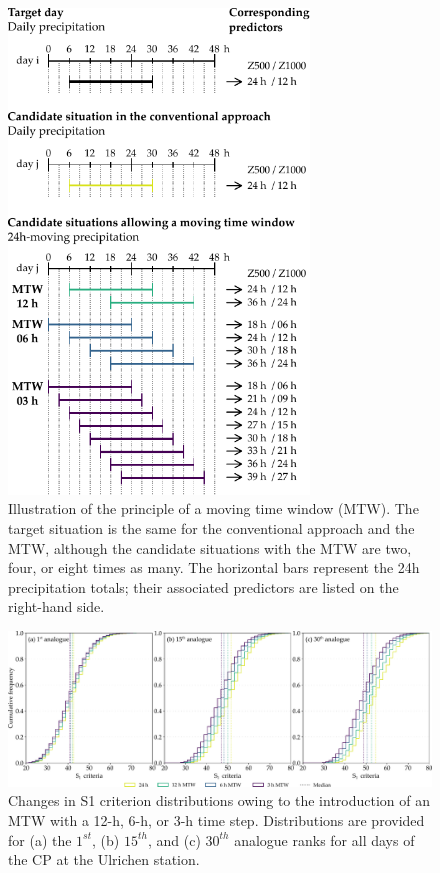 \documentclass[hess, manuscript]{copernicus}
\begin{document}
	\begin{figure}[htb]
		\begin{center}
			\includegraphics[width=8cm]{fig02.pdf}
		\end{center}
		\caption{Illustration of the principle of a moving time window (MTW). The target situation is the same for the conventional approach and the MTW, although the candidate situations with the MTW are two, four, or eight times as many. The horizontal bars represent the 24h precipitation totals; their associated predictors are listed on the right-hand side.}
		\label{fig:principle}
	\end{figure}

	\begin{figure}[htb]
		\begin{center}
			\includegraphics[width=17cm]{fig03.pdf}
		\end{center}
		\caption{Changes in S1 criterion distributions owing to the introduction of an MTW with a 12-h, 6-h, or 3-h time step. Distributions are provided for (a) the $1^{st}$, (b) $15^{th}$, and (c) $30^{th}$ analogue ranks for all days of the CP at the Ulrichen station.}
		\label{fig:changes_S1_analogs}
	\end{figure}
\end{document}
